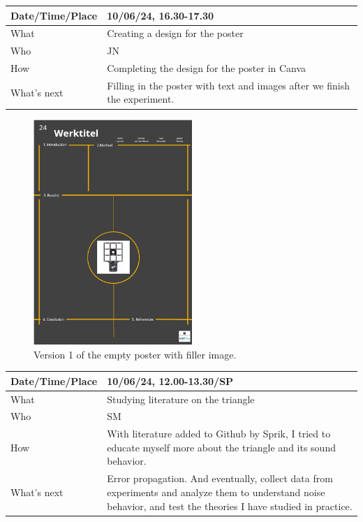 \documentclass{article}
\begin{document}
\begin{table}[H]
\begin{tabular}{|p{1.5in}|p{4in}|}
\hline
Date/Time/Place & 10/06/24, 16.30-17.30 \\ \hline
What            &  Creating a design for the poster\\ \hline
Who             &  JN \\ \hline
How             &  Completing the design for the poster in Canva\\ \hline
What's next     &  Filling in the poster with text and images after we finish the experiment.\\ \hline
\end{tabular}
\end{table}

\begin{figure}[H]
    \centering
    \includegraphics[width=6cm]{PosterV1.png}
    \caption{Version 1 of the empty poster with filler image.}   
\end{figure}

\begin{table}[H]
\begin{tabular}{|p{1.5in}|p{4in}|}
\hline
Date/Time/Place &  10/06/24, 12.00-13.30/SP\\ \hline
What            &  Studying literature on the triangle \\ \hline
Who             &  SM\\ \hline
How             &  With literature added to Github by Sprik, I tried to educate myself more about the triangle and its sound behavior.\\ \hline
What's next     &   Error propagation. And eventually, collect data from experiments and analyze them to understand noise behavior, and test the theories I have studied in practice.\\ \hline
\end{tabular}
\end{table}
\end{document}
